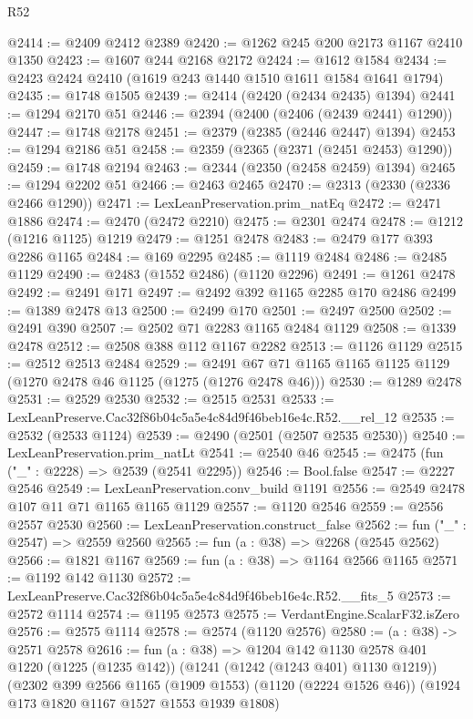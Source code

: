 \begin{lexlean}{R52}
\begin{coremodule}
@2414 := @2409 @2412 @2389
@2420 := @1262 @245 @200 @2173 @1167 @2410 @1350
@2423 := @1607 @244 @2168 @2172
@2424 := @1612 @1584
@2434 := @2423 @2424 @2410 (@1619 @243 @1440 @1510 @1611 @1584 @1641 @1794)
@2435 := @1748 @1505
@2439 := @2414 (@2420 (@2434 @2435) @1394)
@2441 := @1294 @2170 @51
@2446 := @2394 (@2400 (@2406 (@2439 @2441) @1290))
@2447 := @1748 @2178
@2451 := @2379 (@2385 (@2446 @2447) @1394)
@2453 := @1294 @2186 @51
@2458 := @2359 (@2365 (@2371 (@2451 @2453) @1290))
@2459 := @1748 @2194
@2463 := @2344 (@2350 (@2458 @2459) @1394)
@2465 := @1294 @2202 @51
@2466 := @2463 @2465
@2470 := @2313 (@2330 (@2336 @2466 @1290))
@2471 := LexLeanPreservation.prim_natEq
@2472 := @2471 @1886
@2474 := @2470 (@2472 @2210)
@2475 := @2301 @2474
@2478 := @1212 (@1216 @1125) @1219
@2479 := @1251 @2478
@2483 := @2479 @177 @393 @2286 @1165
@2484 := @169 @2295
@2485 := @1119 @2484
@2486 := @2485 @1129
@2490 := @2483 (@1552 @2486) (@1120 @2296)
@2491 := @1261 @2478
@2492 := @2491 @171
@2497 := @2492 @392 @1165 @2285 @170 @2486
@2499 := @1389 @2478 @13
@2500 := @2499 @170
@2501 := @2497 @2500
@2502 := @2491 @390
@2507 := @2502 @71 @2283 @1165 @2484 @1129
@2508 := @1339 @2478
@2512 := @2508 @388 @112 @1167 @2282
@2513 := @1126 @1129
@2515 := @2512 @2513 @2484
@2529 := @2491 @67 @71 @1165 @1165 @1125 @1129 (@1270 @2478 @46 @1125 (@1275 (@1276 @2478 @46)))
@2530 := @1289 @2478
@2531 := @2529 @2530
@2532 := @2515 @2531
@2533 := LexLeanPreserve.Cac32f86b04c5a5e4c84d9f46beb16e4c.R52.__rel_12
@2535 := @2532 (@2533 @1124)
@2539 := @2490 (@2501 (@2507 @2535 @2530))
@2540 := LexLeanPreservation.prim_natLt
@2541 := @2540 @46
@2545 := @2475 (fun ("_" : @2228) => @2539 (@2541 @2295))
@2546 := Bool.false
@2547 := @2227 @2546
@2549 := LexLeanPreservation.conv_build @1191
@2556 := @2549 @2478 @107 @11 @71 @1165 @1165 @1129
@2557 := @1120 @2546
@2559 := @2556 @2557 @2530
@2560 := LexLeanPreservation.construct_false
@2562 := fun ("_" : @2547) => @2559 @2560
@2565 := fun (a : @38) => @2268 (@2545 @2562)
@2566 := @1821 @1167
@2569 := fun (a : @38) => @1164 @2566 @1165
@2571 := @1192 @142 @1130
@2572 := LexLeanPreserve.Cac32f86b04c5a5e4c84d9f46beb16e4c.R52.__fits_5
@2573 := @2572 @1114
@2574 := @1195 @2573
@2575 := VerdantEngine.ScalarF32.isZero
@2576 := @2575 @1114
@2578 := @2574 (@1120 @2576)
@2580 := (a : @38) -> @2571 @2578
@2616 := fun (a : @38) =>
  @1204
    @142
    @1130
    @2578
    @401
    @1220
    (@1225 (@1235 @142))
    (@1241 (@1242 (@1243 @401) @1130 @1219))
    (@2302
      @399
      @2566
      @1165
      (@1909 @1553)
      (@1120 (@2224 @1526 @46))
      (@1924 @173 @1820 @1167 @1527 @1553 @1939 @1808)

\end{coremodule}
\end{lexlean}
